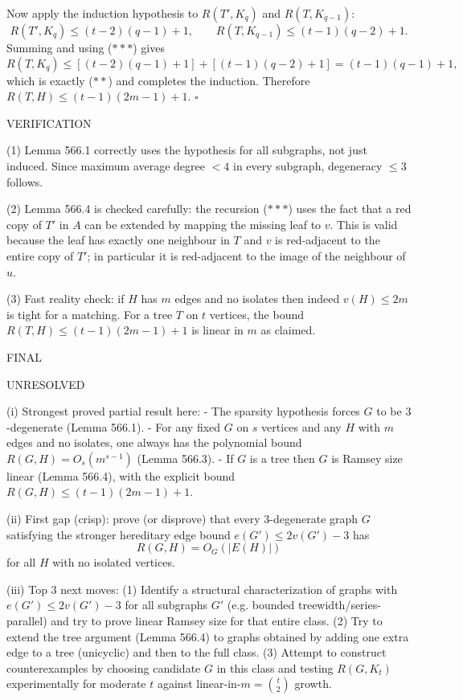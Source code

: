 Now apply the induction hypothesis to $R(T',K_q)$ and $R(T,K_{q-1})$:
\[
R(T',K_q) \le (t-2)(q-1)+1,
\qquad
R(T,K_{q-1}) \le (t-1)(q-2)+1.
\]
Summing and using ($***$) gives
\[
R(T,K_q) \le [(t-2)(q-1)+1] + [(t-1)(q-2)+1] = (t-1)(q-1)+1,
\]
which is exactly ($**$) and completes the induction.
Therefore $R(T,H)\le (t-1)(2m-1)+1$. \hfill$\square$

VERIFICATION

(1) Lemma 566.1 correctly uses the hypothesis for all subgraphs, not just induced.
Since maximum average degree $<4$ in every subgraph, degeneracy $\le 3$ follows.

(2) Lemma 566.4 is checked carefully: the recursion ($***$) uses the fact that a red copy of $T'$ in $A$ can be extended by mapping the missing leaf to $v$.
This is valid because the leaf has exactly one neighbour in $T$ and $v$ is red-adjacent to the entire copy of $T'$; in particular it is red-adjacent to the image of the neighbour of $u$.

(3) Fast reality check: if $H$ has $m$ edges and no isolates then indeed $v(H)\le 2m$ is tight for a matching.
For a tree $T$ on $t$ vertices, the bound $R(T,H)\le (t-1)(2m-1)+1$ is linear in $m$ as claimed.

FINAL

UNRESOLVED

(i) Strongest proved partial result here:
- The sparsity hypothesis forces $G$ to be $3$-degenerate (Lemma 566.1).
- For any fixed $G$ on $s$ vertices and any $H$ with $m$ edges and no isolates, one always has the polynomial bound $R(G,H)=O_s(m^{s-1})$ (Lemma 566.3).
- If $G$ is a tree then $G$ is Ramsey size linear (Lemma 566.4), with the explicit bound $R(G,H)\le (t-1)(2m-1)+1$.

(ii) First gap (crisp): prove (or disprove) that every $3$-degenerate graph $G$ satisfying the stronger hereditary edge bound $e(G')\le 2v(G')-3$ has
\[
R(G,H) = O_G(|E(H)|)
\]
for all $H$ with no isolated vertices.

(iii) Top 3 next moves:
(1) Identify a structural characterization of graphs with $e(G')\le 2v(G')-3$ for all subgraphs $G'$ (e.g. bounded treewidth/series-parallel) and try to prove linear Ramsey size for that entire class.
(2) Try to extend the tree argument (Lemma 566.4) to graphs obtained by adding one extra edge to a tree (unicyclic) and then to the full class.
(3) Attempt to construct counterexamples by choosing candidate $G$ in this class and testing $R(G,K_t)$ experimentally for moderate $t$ against linear-in-$m=\binom{t}{2}$ growth.

